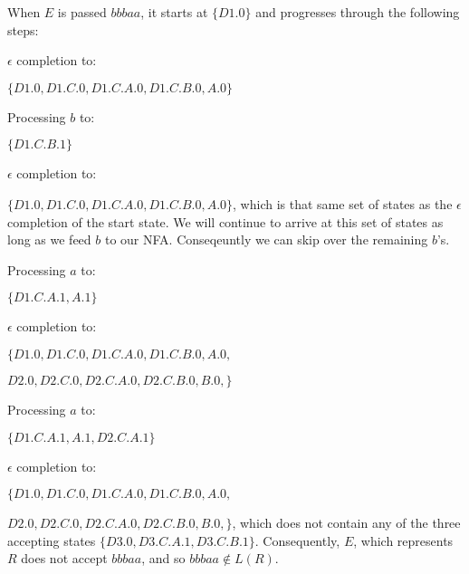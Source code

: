 \documentclass[12pt]{article}
\begin{document}
When $E$ is passed $bbbaa$, it starts at $\{D1.0\}$ and progresses through the following steps: 

  $\epsilon$ completion to:
  
  $\{D1.0, D1.C.0, D1.C.A.0, D1.C.B.0, A.0\}$
  
  Processing $b$ to:
  
  $\{D1.C.B.1\}$
  
  $\epsilon$ completion to:
  
  $\{D1.0, D1.C.0, D1.C.A.0, D1.C.B.0, A.0\}$, which is that same set of states as the $\epsilon$ completion of the start state. We will continue to arrive at this set of states as long as we feed $b$ to our NFA. Conseqeuntly we can skip over the remaining $b$'s.
  
  Processing $a$ to:
  
  $\{D1.C.A.1, A.1\}$
  
  $\epsilon$ completion to:
  
  $\{D1.0, D1.C.0, D1.C.A.0, D1.C.B.0, A.0,$
  
   $ D2.0, D2.C.0, D2.C.A.0, D2.C.B.0, B.0, \}$
   
  Processing $a$ to:
  
  $\{D1.C.A.1, A.1, D2.C.A.1\}$
  
  $\epsilon$ completion to:
  
  $\{D1.0, D1.C.0, D1.C.A.0, D1.C.B.0, A.0,$
  
   $ D2.0, D2.C.0, D2.C.A.0, D2.C.B.0, B.0, \}$, which does not contain any of the three accepting states $\{D3.0, D3.C.A.1, D3.C.B.1\}$. Consequently, $E$, which represents $R$ does not accept $bbbaa$, and so $bbbaa \not\in L(R)$.
  
  
\end{document}
